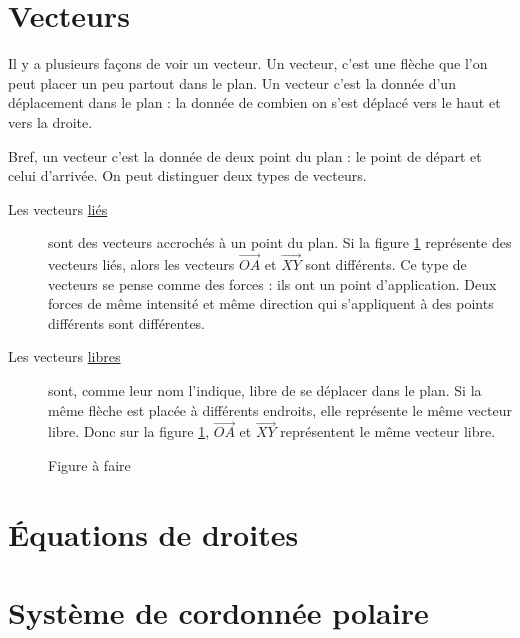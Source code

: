 \documentclass[a4paper,12pt]{book}
\theoremstyle{mes_exemples}	\newtheorem{exemple}[numtho]{Exemple}
\theoremstyle{mes_tho}
\begin{document}
\section{Vecteurs}

Il y a plusieurs façons de voir un vecteur. Un vecteur, c'est une flèche que l'on peut placer un peu partout dans le plan. Un vecteur c'est la donnée d'un déplacement dans le plan : la donnée de combien on s'est déplacé vers le haut et vers la droite.

Bref, un vecteur c'est la donnée de deux point du plan : le point de départ et celui d'arrivée. On peut distinguer deux types de vecteurs.
\begin{description}

\item[Les vecteurs \href{http://fr.wikipedia.org/wiki/Vente_liée}{liés}] sont des vecteurs accrochés à un point du plan. Si la figure \ref{FigVectLiesoupas} représente des vecteurs liés, alors les vecteurs $\overrightarrow{OA}$ et $\overrightarrow{XY}$ sont différents. Ce type de vecteurs se pense comme des forces : ils ont un point d'application. Deux forces de même intensité et même direction qui s'appliquent à des points différents sont différentes.

\item[Les vecteurs \href{http://fr.wikipedia.org/wiki/Portail:Logiciels_libres}{libres}] sont, comme leur nom l'indique, libre de se déplacer dans le plan. Si la même flèche est placée à différents endroits, elle représente le même vecteur libre. Donc sur la figure \ref{FigVectLiesoupas}, $\overrightarrow{OA}$ et $\overrightarrow{ XY }$ représentent le même vecteur libre.
\end{description}

\begin{figure}
\caption{Figure à faire}  \label{FigVectLiesoupas}
\end{figure}

\section{Équations de droites}


\section{Système de cordonnée polaire}
\end{document}
